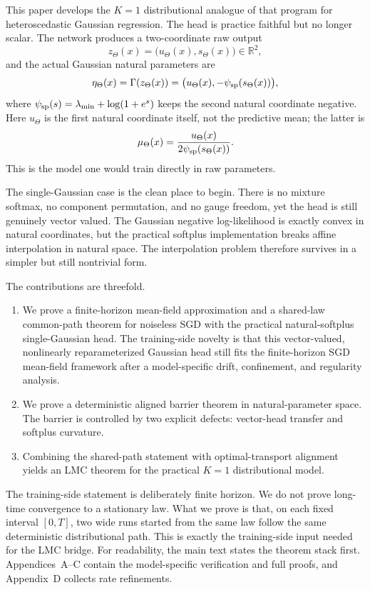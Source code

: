 \documentclass[11pt]{article}
\theoremstyle{definition}
\newcommand{\R}{\mathbb{R}}
\begin{document}
This paper develops the $K=1$ distributional analogue of that program for
heteroscedastic Gaussian regression. The head is practice faithful but no
longer scalar. The network produces a two-coordinate raw output
\[
  z_\Theta(x)=\bigl(u_\Theta(x),s_\Theta(x)\bigr)\in\R^2,
\]
and the actual Gaussian natural parameters are
\[
  \eta_\Theta(x)=\Gamma(z_\Theta(x))
  =
  \bigl(u_\Theta(x),-\psi_{\rm sp}(s_\Theta(x))\bigr),
\]
where $\psi_{\rm sp}(s)=\lambda_{\min}+\log(1+e^s)$ keeps the second natural
coordinate negative. Here $u_\Theta$ is the first natural coordinate itself,
not the predictive mean; the latter is
\[
  \mu_\Theta(x)=\frac{u_\Theta(x)}{2\psi_{\rm sp}(s_\Theta(x))}.
\]
This is the model one would train directly in raw parameters.

The single-Gaussian case is the clean place to begin. There is no mixture
softmax, no component permutation, and no gauge freedom, yet the head is still
genuinely vector valued. The Gaussian negative log-likelihood is exactly convex
in natural coordinates, but the practical softplus implementation breaks affine
interpolation in natural space. The interpolation problem therefore survives in
a simpler but still nontrivial form.

The contributions are threefold.
\begin{enumerate}[label=(C\arabic*)]
  \item We prove a finite-horizon mean-field approximation and a shared-law
  common-path theorem for noiseless SGD with the practical natural-softplus
  single-Gaussian head. The training-side novelty is that this vector-valued,
  nonlinearly reparameterized Gaussian head still fits the finite-horizon SGD
  mean-field framework after a model-specific drift, confinement, and
  regularity analysis.
  \item We prove a deterministic aligned barrier theorem in natural-parameter
  space. The barrier is controlled by two explicit defects: vector-head
  transfer and softplus curvature.
  \item Combining the shared-path statement with optimal-transport alignment
  yields an LMC theorem for the practical $K=1$ distributional model.
\end{enumerate}

The training-side statement is deliberately finite horizon. We do not prove
long-time convergence to a stationary law. What we prove is that, on each fixed
interval $[0,T]$, two wide runs started from the same law follow the same
deterministic distributional path. This is exactly the training-side input
needed for the LMC bridge. For readability, the main text states the theorem
stack first. Appendices~A--C contain the model-specific verification and full
proofs, and Appendix~D collects rate refinements.
\end{document}
